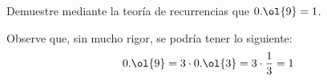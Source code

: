 \begin{ejercicio}
\begin{comment}
    Por tanto, la solución particular de la recurrencia es:
    \begin{equation*}
        x_n^{(p)} = \left(\dfrac{-\alpha}{(\alpha-1)^2} + \dfrac{n\alpha}{\alpha-1}\right)\alpha^n
    \end{equation*}
\end{comment}

\end{ejercicio}



\begin{ejercicio}
    Demuestre mediante la teoría de recurrencias que $0.\ol{9}=1$.
    \begin{observacion}
        Observe que, sin mucho rigor, se podría tener lo siguiente:
        \begin{equation*}
            0.\ol{9} = 3\cdot 0.\ol{3} = 3\cdot \dfrac{1}{3} = 1
        \end{equation*}
    \end{observacion}
\end{ejercicio}


